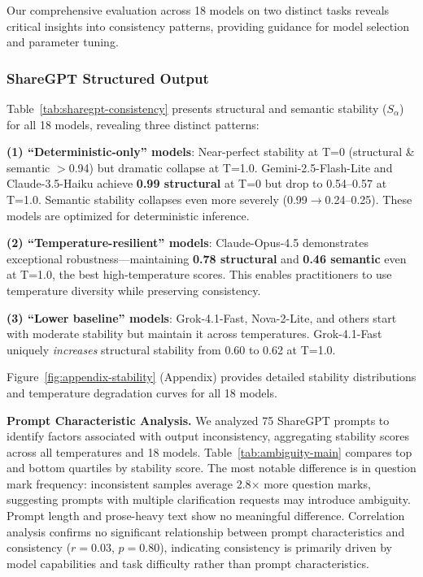 \documentclass{article}
\theoremstyle{plain}
\theoremstyle{definition}
\begin{document}
Our comprehensive evaluation across 18 models on two distinct tasks reveals critical insights into consistency patterns, providing guidance for model selection and parameter tuning.

\subsubsection{ShareGPT Structured Output}
Table~\ref{tab:sharegpt-consistency} presents structural and semantic stability ($S_\alpha$) for all 18 models, revealing three distinct patterns:

\textbf{(1) ``Deterministic-only'' models}: Near-perfect stability at T=0 (structural \& semantic $>$0.94) but dramatic collapse at T=1.0. Gemini-2.5-Flash-Lite and Claude-3.5-Haiku achieve \textbf{0.99 structural} at T=0 but drop to 0.54--0.57 at T=1.0. Semantic stability collapses even more severely (0.99$\to$0.24--0.25). These models are optimized for deterministic inference.

\textbf{(2) ``Temperature-resilient'' models}: Claude-Opus-4.5 demonstrates exceptional robustness---maintaining \textbf{0.78 structural} and \textbf{0.46 semantic} even at T=1.0, the best high-temperature scores. This enables practitioners to use temperature diversity while preserving consistency.

\textbf{(3) ``Lower baseline'' models}: Grok-4.1-Fast, Nova-2-Lite, and others start with moderate stability but maintain it across temperatures. Grok-4.1-Fast uniquely \textit{increases} structural stability from 0.60 to 0.62 at T=1.0.

Figure~\ref{fig:appendix-stability} (Appendix) provides detailed stability distributions and temperature degradation curves for all 18 models.

\textbf{Prompt Characteristic Analysis.} We analyzed 75 ShareGPT prompts to identify factors associated with output inconsistency, aggregating stability scores across all temperatures and 18 models. Table~\ref{tab:ambiguity-main} compares top and bottom quartiles by stability score. The most notable difference is in question mark frequency: inconsistent samples average 2.8$\times$ more question marks, suggesting prompts with multiple clarification requests may introduce ambiguity. Prompt length and prose-heavy text show no meaningful difference. Correlation analysis confirms no significant relationship between prompt characteristics and consistency ($r = 0.03$, $p = 0.80$), indicating consistency is primarily driven by model capabilities and task difficulty rather than prompt characteristics.
\end{document}
